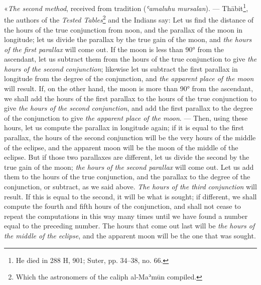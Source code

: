 \documentclass[11pt]{article}
\begin{document}
\par «\emph{The second method}, received from tradition (\emph{ʿamaluhu mursalan}). — Thābit\footnote{He died in 288 H, 901; Suter, pp. 34–38, no. 66.}, the authors of the \emph{Tested Tables}\footnote{Which the astronomers of the caliph al-Maʾmūn compiled.} and the Indians say: Let us find the distance of the hours of the true conjunction from noon, and the parallax of the moon in longitude; let us divide the parallax by the true gain of the moon, and \emph{the hours of the first parallax} will come out. If the moon is less than 90° from the ascendant, let us subtract them from the hours of the true conjunction to give \emph{the hours of the second conjunction}; likewise let us subtract the first parallax in longitude from the degree of the conjunction, and \emph{the apparent place of the moon} will result. If, on the other hand, the moon is more than 90° from the ascendant, we shall add the hours of the first parallax to the hours of the true conjunction to give \emph{the hours of the second conjunction}, and add the first parallax to the degree of the conjunction to give \emph{the apparent place of the moon}. — Then, using these hours, let us compute the parallax in longitude again; if it is equal to the first parallax, the hours of the second conjunction will be the very hours of the middle of the eclipse, and the apparent moon will be the moon of the middle of the eclipse. But if those two parallaxes are different, let us divide the second by the true gain of the moon; \emph{the hours of the second parallax} will come out. Let us add them to the hours of the true conjunction, and the parallax to the degree of the conjunction, or subtract, as we said above. \emph{The hours of the third conjunction} will result. If this is equal to the second, it will be what is sought; if different, we shall compute the fourth and fifth hours of the conjunction, and shall not cease to repeat the computations in this way many times until we have found a number equal to the preceding number. The hours that come out last will be \emph{the hours of the middle of the eclipse}, and the apparent moon will be the one that was sought.\par
\end{document}
